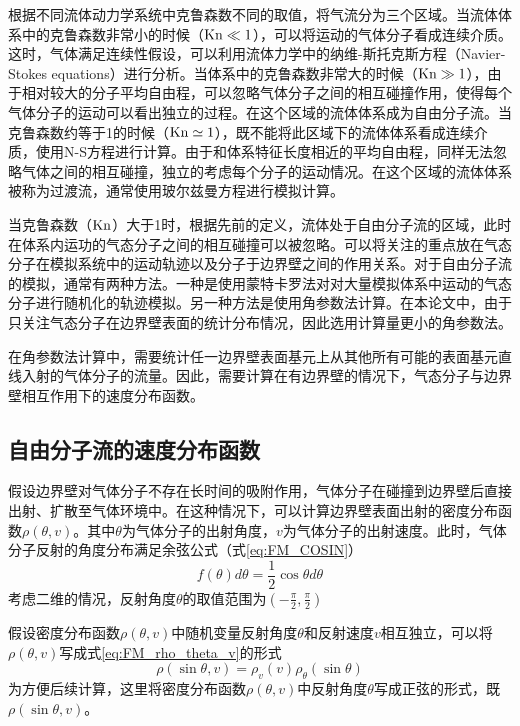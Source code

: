     根据不同流体动力学系统中克鲁森数不同的取值，将气流分为三个区域。当流体体系中的克鲁森数非常小的时候（${\rm Kn}\ll 1$），可以将运动的气体分子看成连续介质。这时，气体满足连续性假设，可以利用流体力学中的纳维-斯托克斯方程（Navier-Stokes equations）进行分析。当体系中的克鲁森数非常大的时候（${\rm Kn}\gg 1$），由于相对较大的分子平均自由程，可以忽略气体分子之间的相互碰撞作用，使得每个气体分子的运动可以看出独立的过程。在这个区域的流体体系成为自由分子流。当克鲁森数约等于1的时候（${\rm Kn}\simeq 1$），既不能将此区域下的流体体系看成连续介质，使用N-S方程进行计算。由于和体系特征长度相近的平均自由程，同样无法忽略气体之间的相互碰撞，独立的考虑每个分子的运动情况。在这个区域的流体体系被称为过渡流，通常使用玻尔兹曼方程进行模拟计算。

    当克鲁森数（${\rm Kn}$）大于1时，根据先前的定义，流体处于自由分子流的区域，此时在体系内运功的气态分子之间的相互碰撞可以被忽略。可以将关注的重点放在气态分子在模拟系统中的运动轨迹以及分子于边界壁之间的作用关系。对于自由分子流的模拟，通常有两种方法。一种是使用蒙特卡罗法对对大量模拟体系中运动的气态分子进行随机化的轨迹模拟。另一种方法是使用角参数法计算。在本论文中，由于只关注气态分子在边界壁表面的统计分布情况，因此选用计算量更小的角参数法。

    在角参数法计算中，需要统计任一边界壁表面基元上从其他所有可能的表面基元直线入射的气体分子的流量。因此，需要计算在有边界壁的情况下，气态分子与边界壁相互作用下的速度分布函数。
    
    \subsection{自由分子流的速度分布函数}

    假设边界壁对气体分子不存在长时间的吸附作用，气体分子在碰撞到边界壁后直接出射、扩散至气体环境中。在这种情况下，可以计算边界壁表面出射的密度分布函数$\rho\left(\theta, v\right)$。其中$\theta$为气体分子的出射角度，$v$为气体分子的出射速度。此时，气体分子反射的角度分布满足余弦公式（式\eqref{eq:FM_COSIN}）\chinesecolon
    \begin{equation}
        \label{eq:FM_COSIN}
        f\left(\theta\right)d\theta =\frac{1}{2}\cos\theta d\theta 
    \end{equation}    
    考虑二维的情况，反射角度$\theta$的取值范围为$\left(-\frac{\pi}{2},\frac{\pi}{2}\right)$

    假设密度分布函数$\rho\left(\theta, v\right)$中随机变量反射角度$\theta$和反射速度$v$相互独立，可以将$\rho\left(\theta, v\right)$写成式\eqref{eq:FM_rho_theta_v}的形式\chinesecolon
    \begin{equation}
        \label{eq:FM_rho_theta_v}
        \rho\left(\sin\theta,v\right)=\rho_v\left(v\right)\rho_\theta\left(\sin\theta\right)
    \end{equation}
    为方便后续计算，这里将密度分布函数$\rho\left(\theta, v\right)$中反射角度$\theta$写成正弦的形式，既$\rho(\sin\theta,v)$。

